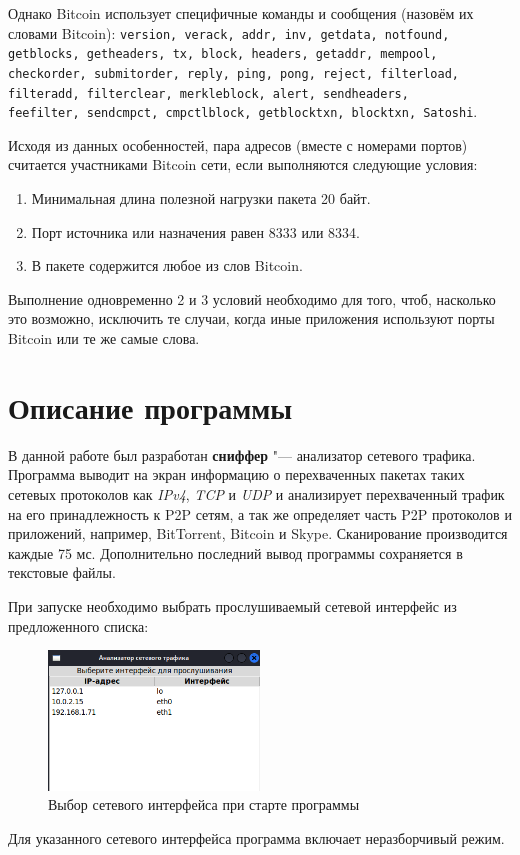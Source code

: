 \documentclass[bachelor, och, coursework]{SCWorks}
\begin{document}
Однако Bitcoin использует специфичные команды и сообщения (назовём их словами Bitcoin): 
\texttt{version, verack, addr, inv, getdata, notfound, getblocks, getheaders, tx,  
block, headers, getaddr, mempool, \\ checkorder, submitorder, reply, ping, pong, reject, 
filterload, \\ filteradd, filterclear, merkleblock, alert, sendheaders, \\ feefilter,
sendcmpct, cmpctlblock, getblocktxn, blocktxn, Satoshi}.

Исходя из данных особенностей, пара адресов (вместе с номерами портов) считается участниками Bitcoin сети, если выполняются следующие условия:
\begin{enumerate}
    \item Минимальная длина полезной нагрузки пакета 20 байт.
    \item Порт источника или назначения равен 8333 или 8334.
    \item В пакете содержится любое из слов Bitcoin.
\end{enumerate}

Выполнение одновременно 2 и 3 условий необходимо для того, чтоб, насколько это возможно, исключить те случаи, когда иные приложения используют порты Bitcoin или те же самые слова.

\section{Описание программы}
В данной работе был разработан \textbf{сниффер} "--- анализатор сетевого трафика. 
Программа выводит на экран информацию о перехваченных пакетах таких сетевых протоколов как \textit{IPv4}, \textit{TCP} и \textit{UDP} и анализирует перехваченный трафик на его принадлежность к P2P сетям, а так же определяет часть P2P протоколов и приложений, например, BitTorrent, Bitcoin и Skype. Сканирование производится каждые 75 мс.
Дополнительно последний вывод программы сохраняется в текстовые файлы.

При запуске необходимо выбрать прослушиваемый сетевой интерфейс из предложенного списка:
\begin{figure}[H]
    \centering
    \includegraphics[width=0.5\textwidth]{ifaces.png}
    \caption{Выбор сетевого интерфейса при старте программы}
\end{figure}
Для указанного сетевого интерфейса программа включает неразборчивый режим.
\end{document}
